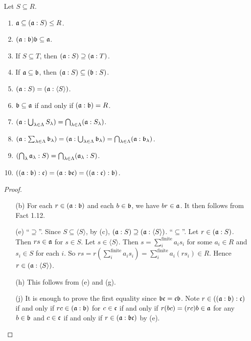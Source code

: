 \begin{fact}
    Let $S \subseteq R$.
    \begin{enumerate}
        \item $\mathfrak{a} \subseteq (\mathfrak{a}:S) \leq R$.
        \item $(\mathfrak{a}:\mathfrak{b})\mathfrak{b} \subseteq \mathfrak{a}$. 
        \item If $S \subseteq T$, then $(\mathfrak{a}:S) \supseteq (\mathfrak{a}:T)$.
        \item If $\mathfrak{a} \subseteq \mathfrak{b}$, then $(\mathfrak{a}:S) \subseteq (\mathfrak{b}:S)$.
        \item $(\mathfrak{a}:S) = (\mathfrak{a}:\langle S \rangle)$.
        \item $\mathfrak{b} \subseteq \mathfrak{a}$ if and only if $(\mathfrak{a}:\mathfrak{b}) = R$.
        \item $(\mathfrak{a}: \bigcup_{\lambda \in \Lambda}S_\lambda) = \bigcap_{\lambda \in \Lambda} (\mathfrak{a}:S_\lambda)$.
        \item $(\mathfrak{a}: \sum_{\lambda \in \Lambda}\mathfrak{b}_\lambda) = (\mathfrak{a}: \bigcup_{\lambda \in \Lambda} \mathfrak{b}_\lambda) = \bigcap_{\lambda \in \Lambda}(\mathfrak{a}: \mathfrak{b}_\lambda)$.
        \item $(\bigcap_{\lambda}\mathfrak{a}_\lambda:S) = \bigcap_{\lambda \in \Lambda}(\mathfrak{a}_\lambda:S)$.
        \item $((\mathfrak{a}:\mathfrak{b}):\mathfrak{c}) = (\mathfrak{a}:\mathfrak{b}\mathfrak{c}) = ((\mathfrak{a}:\mathfrak{c}):\mathfrak{b})$.
    \end{enumerate}
\end{fact}

\begin{proof}
    \begin{enumerate}
        \item[(b)]
            For each $r \in (\mathfrak{a}:\mathfrak{b})$ and each $b \in \mathfrak{b}$, we have $br \in \mathfrak{a}$. It then follows from Fact 1.12.
        \item[(e)]
            ``$\supseteq$''. Since $S \subseteq \langle S \rangle$, by (c), $(\mathfrak{a}:S) \supseteq (\mathfrak{a}:\langle S \rangle)$. ``$\subseteq$''. Let $r \in (\mathfrak{a}:S)$. Then $rs \in \mathfrak{a}$ for $s \in S$. Let $s \in \langle S \rangle$. Then $s = \sum_{i}^{\text{finite}}a_is_i$ for some $a_i \in R$ and $s_i \in S$ for each $i$. So $rs = r(\sum_i^{\text{finite}}a_is_i) = \sum_i^{\text{finite}} a_i(rs_i) \in R$. Hence $r \in (\mathfrak{a}:\langle S \rangle)$.
        \item[(h)] This follows from (e) and (g).
        \item [(j)]
            It is enough to prove the first equality since $\mathfrak{b}\mathfrak{c} = \mathfrak{c}\mathfrak{b}$. Note $r \in ((\mathfrak{a}:\mathfrak{b}):\mathfrak{c})$ if and only if $rc \in (\mathfrak{a}:\mathfrak{b})$ for $c \in \mathfrak{c}$ if and only if $r(bc) = (rc)b \in \mathfrak{a}$ for any $b \in \mathfrak{b}$ and $c \in \mathfrak{c}$ if and only if $r \in (\mathfrak{a}:\mathfrak{b}\mathfrak{c})$ by (e). \qedhere
    \end{enumerate}
\end{proof}

